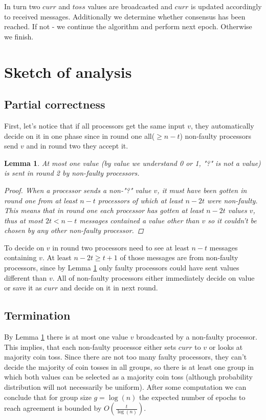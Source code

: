 \documentclass{article}
\newtheorem{lemma}{Lemma}
\begin{document}
In turn two $curr$ and $toss$ values are broadcasted and $curr$ is updated accordingly to received messages. Additionally we determine whether consensus has been reached. If not - we continue the algorithm and perform next epoch. Otherwise we finish. 

\section{Sketch of analysis} \label{sketch}
\subsection{Partial correctness}

First, let's notice that if all processors get the same input $v$, they automatically decide on it in one phase since in round one all($\geq n-t$) non-faulty processors send $v$ and in round two they accept it.
\begin{lemma} \label{lem1}
At most one value (by value we understand 0 or 1, "?" is not a value) is sent in round 2 by non-faulty processors.
\begin{proof}
When a processor sends a non-"?" value $v$, it must have been gotten in round one from at least $n-t$ processors of which at least $n-2t$ were non-faulty. This means that in round one each processor has gotten at least $n-2t$ values $v$, thus at most $2t < n-t$ messages contained a value other than $v$ so it couldn't be chosen by any other non-faulty processor.
\end{proof}
\end{lemma}

To decide on $v$ in round two processors need to see at least $n-t$ messages containing $v$. At least $n-2t \geq t+1$ of those messages are from non-faulty processors, since by Lemma \ref{lem1} only faulty processors could have sent values different than $v$. All of non-faulty processors either immediately decide on value or save it as $curr$ and decide on it in next round.

\subsection{Termination}
By Lemma \ref{lem1} there is at most one value $v$ broadcasted by a non-faulty processor. This implies, that each non-faulty processor either sets $curr$ to $v$ or looks at majority coin toss. Since there are not too many faulty processors, they can't decide the majority of coin tosses in all groups, so there is at least one group in which both values can be selected as a majority coin toss (although probability distribution will not necessarily be uniform). After some computation we can conclude that for group size $g = \log(n)$ the expected number of epochs to reach agreement is bounded by $O \left( \frac{t}{\log(n)} \right)$.



\end{document}
